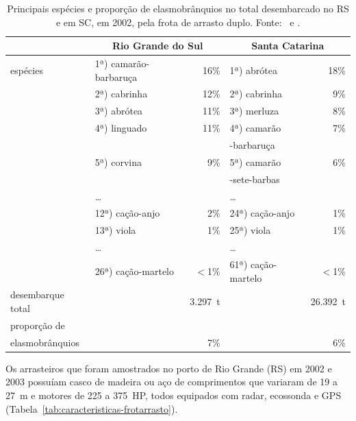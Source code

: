 \documentclass[a4paper,11pt,twoside,showtrims,onecolumn,openright,final]{memoir}
\begin{document}
\begin{table}
\caption[Principais espécies e proporção de elasmobrânquios no total desembarcado no RS e em SC, em 2002,
	 pela frota de arrasto duplo.]
	{Principais espécies e proporção de elasmobrânquios no total desembarcado no RS e em SC, em 2002,
	 pela frota de arrasto duplo. Fonte: \citet{ceperg2003}\ e \citet{univali2003}.}
\label{tab:capturas-arrastoduplo}
\begin{center}
\begin{tabular*}{\textwidth}{l@{\extracolsep{\fill}}lrlr}
\toprule
		& \multicolumn{2}{c}{Rio Grande do Sul} & \multicolumn{2}{c}{Santa Catarina} \\
\midrule
espécies 	& 1ª) camarão-barbaruça & 16\%	& 1ª) abrótea 		  & 18\%	\\
		& 2ª) cabrinha 		& 12\%	& 2ª) cabrinha 		  & 9\%		\\
		& 3ª) abrótea 		& 11\%	& 3ª) merluza 		  & 8\%		\\
		& 4ª) linguado 		& 11\%	& 4ª) camarão		  & 7\%		\\
		&			&	& \hspace{1em} -barbaruça &		\\
		& 5ª) corvina 		& 9\%	& 5ª) camarão 		  & 6\%		\\
		&			&	& \hspace{1em} -sete-barbas  &		\\
		& \ldots 		&	& \ldots 		  &		\\
		& 12ª) cação-anjo 	& 2\%	& 24ª) cação-anjo 	  & 1\%		\\
		& 13ª) viola 		& 1\%	& 25ª) viola 		  & 1\%		\\
		& \ldots 		&	& \ldots 		  &		\\
		& 26ª) cação-martelo 	& $<$1\%& 61ª) cação-martelo 	  & $<$1\%	\\
\midrule
desembarque total & 			& 3.297~t& 			  & 26.392~t	\\
\midrule
proporção de	& 			&	& 			  & 		\\
elasmobrânquios	& 			& 7\%	& 			  & 6\%		\\
\bottomrule
\end{tabular*}
\end{center}
\end{table}


Os arrasteiros que foram amostrados no porto de Rio Grande (RS) em 2002  e 2003 possuíam casco 
de madeira ou aço de comprimentos que variaram de 19 a 27~m e motores de 225 a 375~HP, 
todos equipados com radar, ecossonda e GPS (Tabela~\ref{tab:caracteristicas-frotarrasto}). %
\end{document}
